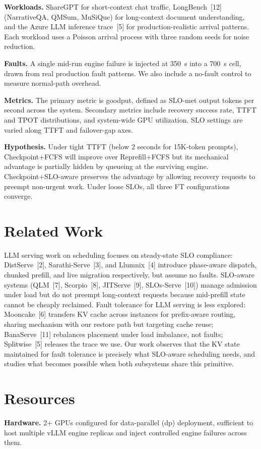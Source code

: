 \documentclass{article}
\begin{document}
\textbf{Workloads.} ShareGPT for short-context chat traffic, LongBench~[12] (NarrativeQA, QMSum, MuSiQue) for long-context document understanding, and the Azure LLM inference trace~[5] for production-realistic arrival patterns. Each workload uses a Poisson arrival process with three random seeds for noise reduction.

\textbf{Faults.} A single mid-run engine failure is injected at 350~s into a 700~s cell, drawn from real production fault patterns. We also include a no-fault control to measure normal-path overhead.

\textbf{Metrics.} The primary metric is goodput, defined as SLO-met output tokens per second across the system. Secondary metrics include recovery success rate, TTFT and TPOT distributions, and system-wide GPU utilization. SLO settings are varied along TTFT and failover-gap axes.

\textbf{Hypothesis.} Under tight TTFT (below 2 seconds for 15K-token prompts), Checkpoint+FCFS will improve over Reprefill+FCFS but its mechanical advantage is partially hidden by queueing at the surviving engine. Checkpoint+SLO-aware preserves the advantage by allowing recovery requests to preempt non-urgent work. Under loose SLOs, all three FT configurations converge.

\section*{Related Work}
LLM serving work on scheduling focuses on steady-state SLO compliance: DistServe~[2], Sarathi-Serve~[3], and Llumnix~[4] introduce phase-aware dispatch, chunked prefill, and live migration respectively, but assume no faults. SLO-aware systems (QLM~[7], Scorpio~[8], JITServe~[9], SLOs-Serve~[10]) manage admission under load but do not preempt long-context requests because mid-prefill state cannot be cheaply reclaimed. Fault tolerance for LLM serving is less explored: Mooncake~[6] transfers KV cache across instances for prefix-aware routing, sharing mechanism with our restore path but targeting cache reuse; BanaServe~[11] rebalances placement under load imbalance, not faults; Splitwise~[5] releases the trace we use. Our work observes that the KV state maintained for fault tolerance is precisely what SLO-aware scheduling needs, and studies what becomes possible when both subsystems share this primitive.

\section*{Resources}
\textbf{Hardware.} 2+ GPUs configured for data-parallel (dp) deployment, sufficient to host multiple vLLM engine replicas and inject controlled engine failures across them.
\end{document}
